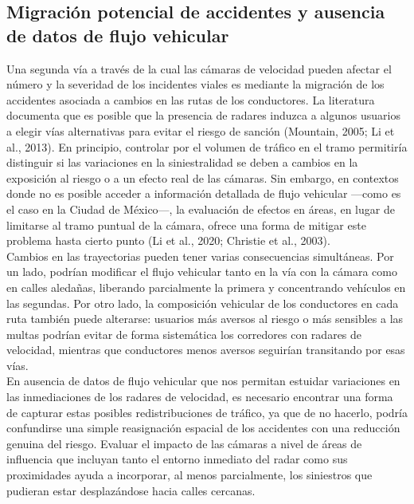 \subsection{Migración potencial de accidentes y ausencia de datos de flujo vehicular}
\noindent Una segunda vía a través de la cual las cámaras de velocidad pueden afectar el número y la severidad de los incidentes viales es mediante la migración de los accidentes asociada a cambios en las rutas de los conductores. La literatura documenta que es posible que la presencia de radares induzca a algunos usuarios a elegir vías alternativas para evitar el riesgo de sanción (Mountain, 2005; Li et al., 2013). En principio, controlar por el volumen de tráfico en el tramo permitiría distinguir si las variaciones en la siniestralidad se deben a cambios en la exposición al riesgo o a un efecto real de las cámaras. Sin embargo, en contextos donde no es posible acceder a información detallada de flujo vehicular ---como es el caso en la Ciudad de México---, la evaluación de efectos en áreas, en lugar de limitarse al tramo puntual de la cámara, ofrece una forma de mitigar este problema hasta cierto punto (Li et al., 2020; Christie et al., 2003).\\

\indent Cambios en las trayectorias pueden tener varias consecuencias simultáneas. Por un lado, podrían modificar el flujo vehicular tanto en la vía con la cámara como en calles aledañas, liberando parcialmente la primera y concentrando vehículos en las segundas. Por otro lado, la composición vehicular de los conductores en cada ruta también puede alterarse: usuarios más aversos al riesgo o más sensibles a las multas podrían evitar de forma sistemática los corredores con radares de velocidad, mientras que conductores menos aversos seguirían transitando por esas vías.\\

En ausencia de datos de flujo vehicular que nos permitan estuidar variaciones en las inmediaciones de los radares de velocidad, es necesario encontrar una forma de capturar estas posibles redistribuciones de tráfico, ya que de no hacerlo, podría confundirse una simple reasignación espacial de los accidentes con una reducción genuina del riesgo. Evaluar el impacto de las cámaras a nivel de áreas de influencia que incluyan tanto el entorno inmediato del radar como sus proximidades ayuda a incorporar, al menos parcialmente, los siniestros que pudieran estar desplazándose hacia calles cercanas.\\

